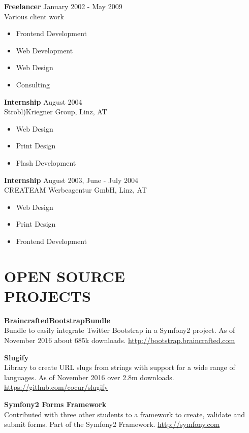 \documentclass[margin]{res}
\begin{document}
\begin{resume}
\textbf{Freelancer} \hfill January 2002 - May 2009 \\
  Various client work
  \begin{itemize}  \itemsep -2pt
    \item Frontend Development
    \item Web Development
    \item Web Design
    \item Consulting
  \end{itemize}

\textbf{Internship} \hfill August 2004 \\
  Strobl)Kriegner Group, Linz, AT
  \begin{itemize}  \itemsep -2pt
    \item Web Design
    \item Print Design
    \item Flash Development
    \end{itemize}

\textbf{Internship} \hfill August 2003, June - July 2004 \\
  CREATEAM Werbeagentur GmbH, Linz, AT
  \begin{itemize}  \itemsep -2pt
    \item Web Design
    \item Print Design
    \item Frontend Development
  \end{itemize}

\section{OPEN SOURCE \\ PROJECTS}

\textbf{BraincraftedBootstrapBundle} \\
  Bundle to easily integrate Twitter Bootstrap in a Symfony2 project. As of November 2016 about 685k downloads. \url{http://bootstrap.braincrafted.com}

\textbf{Slugify} \\
  Library to create URL slugs from strings with support for a wide range of languages. As of November 2016 over 2.8m downloads. \url{https://github.com/cocur/slugify}

\textbf{Symfony2 Forms Framework} \\
  Contributed with three other students to a framework to create, validate and submit forms. Part of the Symfony2 Framework. \url{http://symfony.com}


\end{resume}
\end{document}
